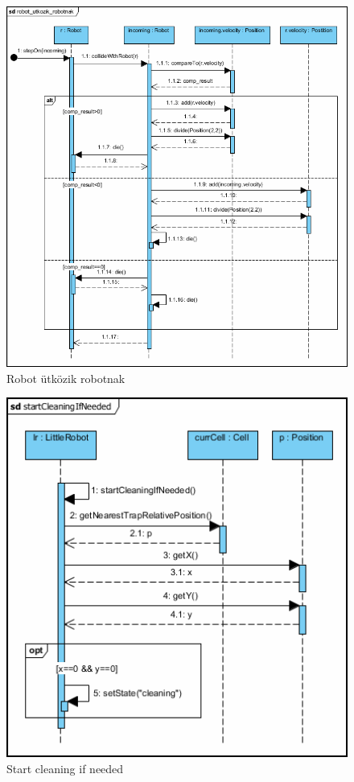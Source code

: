\begin{figure}[h]
	\begin{center}
		\includegraphics[width=17cm]{chapters/chapter01/robot_utkozik_robotnak.png}
		\caption{Robot ütközik robotnak}
		\label{fig:SzkeletonUseCase}
	\end{center}
\end{figure}
\clearpage
\begin{figure}[h]
	\begin{center}
		\includegraphics[width=17cm]{chapters/chapter01/startcleaningifneeded.png}
		\caption{Start cleaning if needed}
		\label{fig:SzkeletonUseCase}
	\end{center}
\end{figure}
\clearpage

